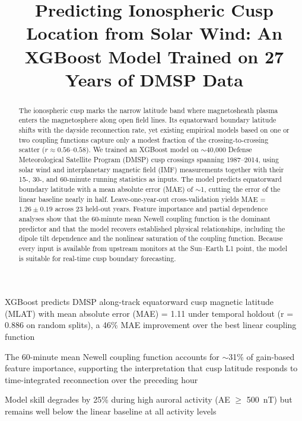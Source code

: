 \documentclass[draft]{agujournal2019}
\let\citet\citeA
\begin{document}
\title{Predicting Ionospheric Cusp Location from Solar Wind: An XGBoost Model Trained on 27 Years of DMSP Data}




\begin{keypoints}
\item XGBoost predicts DMSP along-track equatorward cusp magnetic latitude (MLAT) with mean absolute error (MAE) = 1.11\textdegree{} under temporal holdout (r = 0.886 on random splits), a 46\% MAE improvement over the best linear coupling function
\item The 60-minute mean Newell coupling function accounts for $\sim$31\% of gain-based feature importance, supporting the interpretation that cusp latitude responds to time-integrated reconnection over the preceding hour
\item Model skill degrades by 25\% during high auroral activity (AE $\geq$ 500~nT) but remains well below the linear baseline at all activity levels
\end{keypoints}

\begin{abstract}
The ionospheric cusp marks the narrow latitude band where magnetosheath plasma enters the magnetosphere along open field lines. Its equatorward boundary latitude shifts with the dayside reconnection rate, yet existing empirical models based on one or two coupling functions capture only a modest fraction of the crossing-to-crossing scatter ($r \approx 0.56$--$0.58$). We trained an XGBoost model on $\sim$40{,}000 Defense Meteorological Satellite Program (DMSP) cusp crossings spanning 1987--2014, using solar wind and interplanetary magnetic field (IMF) measurements together with their 15-, 30-, and 60-minute running statistics as inputs. The model predicts equatorward boundary latitude with a mean absolute error (MAE) of $\sim$1\textdegree{}, cutting the error of the \citet{newell2006cusp} linear baseline nearly in half. Leave-one-year-out cross-validation yields MAE = $1.26 \pm 0.19$\textdegree{} across 23 held-out years. Feature importance and partial dependence analyses show that the 60-minute mean Newell coupling function is the dominant predictor and that the model recovers established physical relationships, including the dipole tilt dependence and the nonlinear saturation of the coupling function. Because every input is available from upstream monitors at the Sun--Earth L1 point, the model is suitable for real-time cusp boundary forecasting.
\end{abstract}
\end{document}
